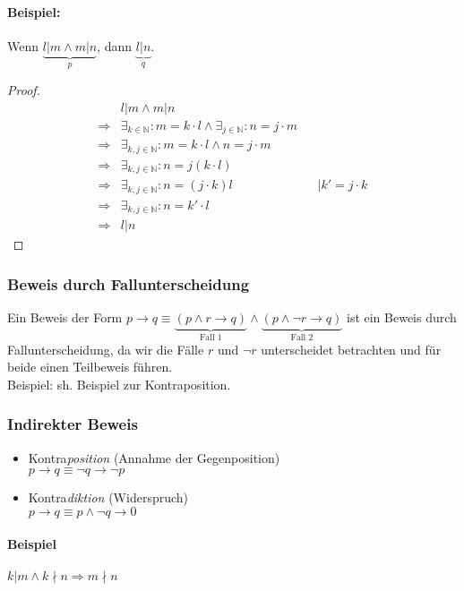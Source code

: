 \paragraph{Beispiel:}Wenn $\underbrace{l|m \land m|n}_{p}$, dann $\underbrace{l|n}_{q}$.
\begin{proof}
\begin{align}
&l|m \land m|n \\
\Rightarrow &\exists_{k\in\mathbb{N}}: m=k\cdot l \land \exists_{j\in\mathbb{N}}: n=j\cdot m \\
\Rightarrow &\exists_{k,j\in\mathbb{N}}: m=k\cdot l \land n=j\cdot m \\
\Rightarrow &\exists_{k,j\in\mathbb{N}}: n=j(k\cdot l) \\
\Rightarrow &\exists_{k,j\in\mathbb{N}}: n=(j\cdot k)l && \mid k'=j\cdot k \\
\Rightarrow &\exists_{k,j\in\mathbb{N}}: n=k' \cdot l \\
\Rightarrow &l|n
\end{align}
\end{proof}

\subsubsection{Beweis durch Fallunterscheidung}
Ein Beweis der Form $p\rightarrow q \equiv \underbrace{(p\land r\rightarrow q)}_\text{Fall 1} \land \underbrace{(p\land\neg r \rightarrow q)}_\text{Fall 2}$ ist ein Beweis durch Fallunterscheidung, da wir die Fälle $r$ und $\neg r$ unterscheidet betrachten und für beide einen Teilbeweis führen.\\
Beispiel: sh. Beispiel zur Kontraposition.
\subsubsection{Indirekter Beweis}
\begin{itemize}
\item Kontra\emph{position} (Annahme der Gegenposition) \\
$p\rightarrow q \equiv \neg q \rightarrow\neg p$
\item Kontra\emph{diktion} (Widerspruch) \\
$p\rightarrow q \equiv p \land\neg q \rightarrow 0$
\end{itemize}

\paragraph{Beispiel}
$k|m\land k\nmid n \Rightarrow m\nmid n$
